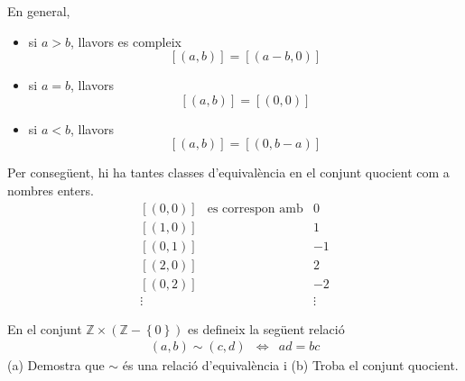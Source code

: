 \begin{solucio}
En general,

\begin{itemize}
\item si $a>b$, llavors es compleix%
\begin{equation*}
\left[ (a,b)\right] =\left[ (a-b,0)\right]
\end{equation*}

\item si $a=b$, llavors%
\begin{equation*}
\left[ (a,b)\right] =\left[ (0,0)\right]
\end{equation*}

\item si $a<b$, llavors%
\begin{equation*}
\left[ (a,b)\right] =\left[ (0,b-a)\right]
\end{equation*}
\end{itemize}

Per conseg\"{u}ent, hi ha tantes classes d'equival\`{e}ncia en el conjunt
quocient com a nombres enters.%
\begin{equation*}
\begin{array}{ccc}
\left[ (0,0)\right] & \text{es correspon amb} & 0 \\
\left[ (1,0)\right] &  & 1 \\
\left[ (0,1)\right] &  & -1 \\
\left[ (2,0)\right] &  & 2 \\
\left[ (0,2)\right] &  & -2 \\
\vdots &  & \vdots%
\end{array}%
\end{equation*}
\end{solucio}

\begin{exer}
En el conjunt $\mathbb{Z}\times \left( \mathbb{Z}-\left\{ 0\right\} \right) $
es defineix la seg\"{u}ent relaci\'{o}%
\begin{equation*}
\begin{array}{ccc}
(a,b)\sim (c,d) & \Longleftrightarrow & ad=bc%
\end{array}%
\end{equation*}%
(a) Demostra que $\sim $ \'{e}s una relaci\'{o} d'equival\`{e}ncia i (b)
Troba el conjunt quocient.
\end{exer}

